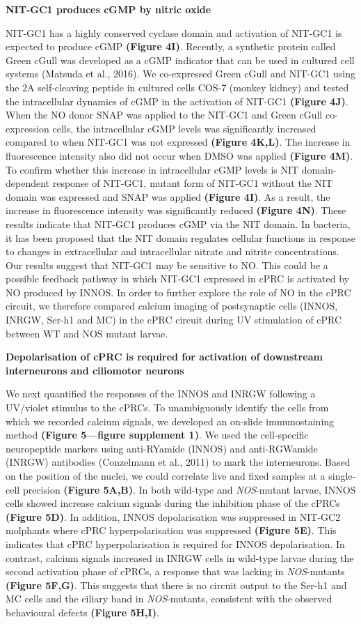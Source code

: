 \documentclass[
  10pt,
  onecolumn]{article}
\begin{document}
\textbf{NIT-GC1 produces cGMP by nitric oxide}

NIT-GC1 has a highly conserved cyclase domain and activation of NIT-GC1
is expected to produce cGMP \textbf{(Figure 4I)}. Recently, a synthetic
protein called Green cGull was developed as a cGMP indicator that can be
used in cultured cell systems (Matsuda et al., 2016). We co-expressed
Green cGull and NIT-GC1 using the 2A self-cleaving peptide in cultured
cells COS-7 (monkey kidney) and tested the intracellular dynamics of
cGMP in the activation of NIT-GC1 \textbf{(Figure 4J)}. When the NO
donor SNAP was applied to the NIT-GC1 and Green cGull co-expression
cells, the intracellular cGMP levels was significantly increased
compared to when NIT-GC1 was not expressed \textbf{(Figure 4K,L)}. The
increase in fluorescence intensity also did not occur when DMSO was
applied \textbf{(Figure 4M)}. To confirm whether this increase in
intracellular cGMP levels is NIT domain-dependent response of NIT-GC1,
mutant form of NIT-GC1 without the NIT domain was expressed and SNAP was
applied \textbf{(Figure 4I)}. As a result, the increase in fluorescence
intensity was significantly reduced \textbf{(Figure 4N)}. These results
indicate that NIT-GC1 produces cGMP via the NIT domain. In bacteria, it
has been proposed that the NIT domain regulates cellular functions in
response to changes in extracellular and intracellular nitrate and
nitrite concentrations. Our results suggest that NIT-GC1 may be
sensitive to NO. This could be a possible feedback pathway in which
NIT-GC1 expressed in cPRC is activated by NO produced by INNOS. In order
to further explore the role of NO in the cPRC circuit, we therefore
compared calcium imaging of postsynaptic cells (INNOS, INRGW, Ser-h1 and
MC) in the cPRC circuit during UV stimulation of cPRC between WT and NOS
mutant larvae.

\textbf{Depolarisation of cPRC is required for activation of downstream
interneurons and ciliomotor neurons}

We next quantified the responses of the INNOS and INRGW following a
UV/violet stimulus to the cPRCs. To unambiguously identify the cells
from which we recorded calcium signals, we developed an on-slide
immunostaining method \textbf{(Figure 5---figure supplement 1)}. We used
the cell-specific neuropeptide markers using anti-RYamide (INNOS) and
anti-RGWamide (INRGW) antibodies (Conzelmann et al., 2011) to mark the
interneurons. Based on the position of the nuclei, we could correlate
live and fixed samples at a single-cell precision \textbf{(Figure
5A,B)}. In both wild-type and \emph{NOS}-mutant larvae, INNOS cells
showed increase calcium signals during the inhibition phase of the cPRCs
\textbf{(Figure 5D)}. In addition, INNOS depolarisation was suppressed
in NIT-GC2 molphants where cPRC hyperpolarisation was suppressed
\textbf{(Figure 5E)}. This indicates that cPRC hyperpolarisation is
required for INNOS depolarisation. In contrast, calcium signals
increased in INRGW cells in wild-type larvae during the second
activation phase of cPRCs, a response that was lacking in
\emph{NOS}-mutants \textbf{(Figure 5F,G)}. This suggests that there is
no circuit output to the Ser-h1 and MC cells and the ciliary band in
\emph{NOS}-mutants, consistent with the observed behavioural defects
\textbf{(Figure 5H,I)}.
\end{document}
